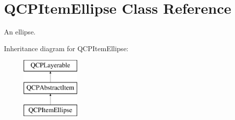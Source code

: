 \hypertarget{classQCPItemEllipse}{\section{\-Q\-C\-P\-Item\-Ellipse \-Class \-Reference}
\label{classQCPItemEllipse}
}


\-An ellipse.  


\-Inheritance diagram for \-Q\-C\-P\-Item\-Ellipse\-:\begin{figure}[H]
\begin{center}
\leavevmode
\includegraphics[height=3.000000cm]{classQCPItemEllipse}
\end{center}
\end{figure}
